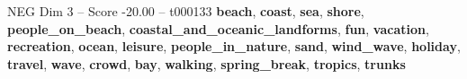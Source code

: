\begin{textsample}{NEG Dim 3 – Score -20.00 – t000133}  \label{ex:f3_neg_017}
\textbf{beach}, \textbf{coast}, \textbf{sea}, \textbf{shore}, \textbf{people\_on\_beach}, \textbf{coastal\_and\_oceanic\_landforms}, \textbf{fun}, \textbf{vacation}, \textbf{recreation}, \textbf{ocean}, \textbf{leisure}, \textbf{people\_in\_nature}, \textbf{sand}, \textbf{wind\_wave}, \textbf{holiday}, \textbf{travel}, \textbf{wave}, \textbf{crowd}, \textbf{bay}, \textbf{walking}, \textbf{spring\_break}, \textbf{tropics}, \textbf{trunks}

\end{textsample}
